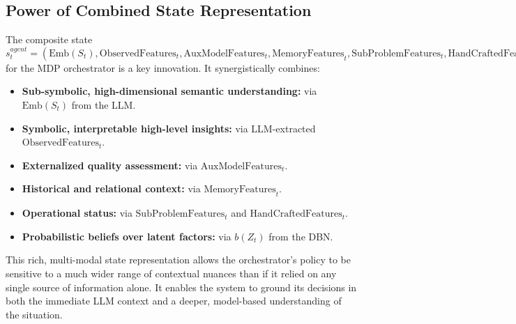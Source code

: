 \documentclass[11pt]{article}
\begin{document}
\subsection{Power of Combined State Representation}
\label{ssec:tg_state_representation}
The composite state $s_t^{agent} = (\text{Emb}(S_t), \text{ObservedFeatures}_t, \text{AuxModelFeatures}_t, \text{MemoryFeatures}_t, \text{SubProblemFeatures}_t, \text{HandCraftedFeatures}_t, b(Z_t))$ for the MDP orchestrator is a key innovation. It synergistically combines:
\begin{itemize}
    \item \textbf{Sub-symbolic, high-dimensional semantic understanding:} via $\text{Emb}(S_t)$ from the LLM.
    \item \textbf{Symbolic, interpretable high-level insights:} via LLM-extracted $\text{ObservedFeatures}_t$.
    \item \textbf{Externalized quality assessment:} via $\text{AuxModelFeatures}_t$.
    \item \textbf{Historical and relational context:} via $\text{MemoryFeatures}_t$.
    \item \textbf{Operational status:} via $\text{SubProblemFeatures}_t$ and $\text{HandCraftedFeatures}_t$.
    \item \textbf{Probabilistic beliefs over latent factors:} via $b(Z_t)$ from the DBN.
\end{itemize}
This rich, multi-modal state representation allows the orchestrator's policy to be sensitive to a much wider range of contextual nuances than if it relied on any single source of information alone. It enables the system to ground its decisions in both the immediate LLM context and a deeper, model-based understanding of the situation.
\end{document}
